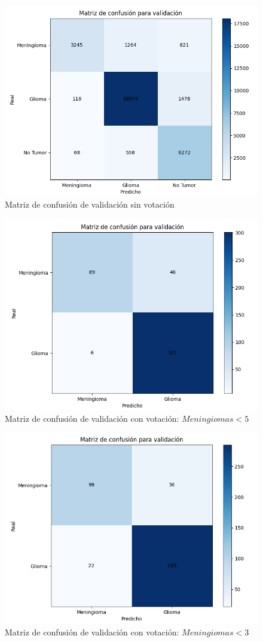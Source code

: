 \begin{figure}[H]
	\centering
	\includegraphics[width=0.8\linewidth]{imagenes/task1_results_validation.png}
	\caption{Matriz de confusión de validación sin votación}
\end{figure}

\begin{figure}[H]
	\centering
	\includegraphics[width=0.8\linewidth]{imagenes/task1_val_5.png}
	\caption{Matriz de confusión de validación con votación: $Meningiomas < 5$}
\end{figure}

\begin{figure}[H]
	\centering
	\includegraphics[width=0.8\linewidth]{imagenes/task1_val_3.png}
	\caption{Matriz de confusión de validación con votación: $Meningiomas < 3$}
\end{figure}

